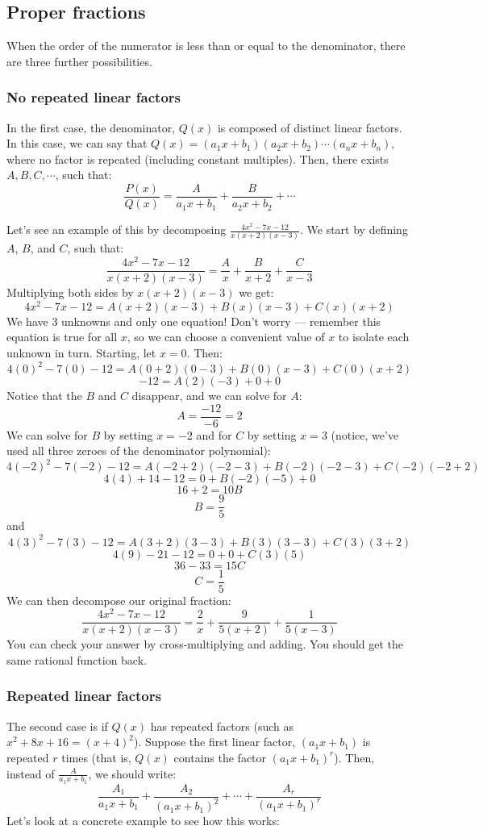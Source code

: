 \subsection{Proper fractions}
When the order of the numerator is less than or equal to the denominator, 
there are three further possibilities. 

\subsubsection{No repeated linear factors}
In the first case, the denominator, $Q(x)$ is composed of distinct linear 
factors. In this case, we can say that $Q(x) = (a_1x + b_1)(a_2x + b_2) \cdots 
(a_nx + b_n)$, where no factor is repeated (including constant multiples). 
Then, there exists $A, B, C, \cdots$, such that:
$$\frac{P(x)}{Q(x)} = \frac{A}{a_1x+b_1} + \frac{B}{a_2x + b_2} + \cdots$$

Let's see an example of this by decomposing $\frac{4x^2 - 7x - 12}{x (x + 2) (x 
- 3)}$. We start by defining $A$, $B$, and $C$, such that:
$$\frac{4x^2 - 7x - 12}{x (x + 2) (x - 3)} = \frac{A}{x} + \frac{B}{x + 2} + 
\frac{C}{x - 3}$$
Multiplying both sides by $x (x + 2) (x - 3)$ we get:
$$4x^2 - 7x - 12 = A(x + 2)(x - 3) + B(x)(x - 3) + C(x)(x + 2)$$
We have 3 unknowns and only one equation! Don't worry --- remember this equation 
is true for all $x$, so we can choose a convenient value of $x$ to isolate 
each unknown in turn. Starting, let $x = 0$. Then:
$$4(0)^2 - 7(0) - 12 = A(0 + 2)(0 - 3) + B(0)(x - 3) + C(0)(x + 2)$$
$$-12 = A(2)(-3) + 0 + 0$$
Notice that the $B$ and $C$ disappear, and we can solve for $A$:
$$A = \frac{-12}{-6} = 2$$
We can solve for $B$ by setting $x = -2$ and for $C$ by setting $x = 3$ 
(notice, we've used all three zeroes of the denominator polynomial):
$$4(-2)^2 - 7(-2) - 12 = A(-2 + 2)(-2 - 3) + B(-2)(-2 - 3) + C(-2)(-2 + 2)$$
$$4(4) + 14 - 12 = 0 + B(-2)(-5) + 0$$
$$16 + 2 = 10B$$
$$B = \frac{9}{5}$$
and
$$4(3)^2 - 7(3) - 12 = A(3 + 2)(3 - 3) + B(3)(3 - 3) + C(3)(3 + 2)$$
$$4(9) - 21 - 12 = 0 + 0 + C(3)(5)$$
$$36 - 33 = 15C$$
$$C = \frac{1}{5}$$
We can then decompose our original fraction:
$$\frac{4x^2 - 7x - 12}{x (x + 2) (x - 3)} = \frac{2}{x} + \frac{9}{5(x + 2)} 
+ \frac{1}{5(x - 3)}$$
You can check your answer by cross-multiplying and adding. You should get the 
same rational function back. 

\subsubsection{Repeated linear factors}
The second case is if $Q(x)$ has repeated factors (such as $x^2 + 8x + 16 = (x 
+ 4)^2$). Suppose the first linear factor, $(a_1x + b_1)$ is repeated $r$ 
times (that is, $Q(x)$ contains the factor $(a_1x + b_1)^r$). Then, instead of 
$\frac{A}{a_1x + b_1}$, we should write:
$$\frac{A_1}{a_1x + b_1} + \frac{A_2}{(a_1x + b_1)^2} + \cdots + \frac{A_r}{(
a_1x + b_1)^r}$$
Let's look at a concrete example to see how this works:

